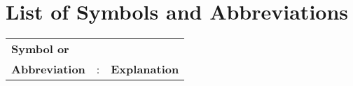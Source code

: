 \chapter*{List of Symbols and Abbreviations}

\begin{tabular}{lcl}
    \textbf{Symbol or}&&\\
    \textbf{Abbreviation} &:& \textbf{Explanation}\\
    

    
\end{tabular}

\clearpage